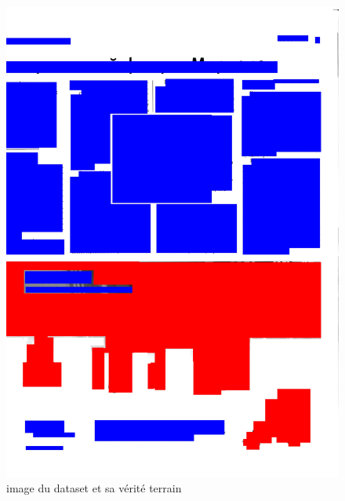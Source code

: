 \documentclass{book}
\begin{document}
\begin{figure}[H]
\begin{center}
\includegraphics[scale=0.2]{images/4cw_m.jpg}
\end{center}
\caption{image du dataset et sa vérité terrain}
\label{exemple2}
\end{figure}
\end{document}
